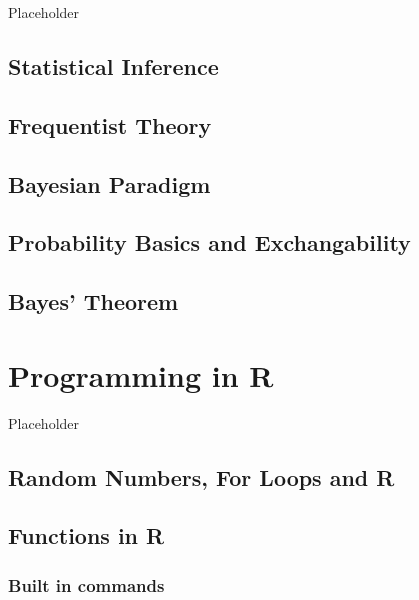 \documentclass[
]{book}
\begin{document}
Placeholder

\hypertarget{statistical-inference}{%
\section{Statistical Inference}\label{statistical-inference}}

\hypertarget{frequentist-theory}{%
\section{Frequentist Theory}\label{frequentist-theory}}

\hypertarget{bayesian-paradigm}{%
\section{Bayesian Paradigm}\label{bayesian-paradigm}}

\hypertarget{probability-basics-and-exchangability}{%
\section{Probability Basics and Exchangability}\label{probability-basics-and-exchangability}}

\hypertarget{bayes-theorem}{%
\section{Bayes' Theorem}\label{bayes-theorem}}

\hypertarget{programming-in-r}{%
\chapter{Programming in R}\label{programming-in-r}}

Placeholder

\hypertarget{random-numbers-for-loops-and-r}{%
\section{Random Numbers, For Loops and R}\label{random-numbers-for-loops-and-r}}

\hypertarget{functions-in-r}{%
\section{Functions in R}\label{functions-in-r}}

\hypertarget{built-in-commands}{%
\subsection{Built in commands}\label{built-in-commands}}
\end{document}
